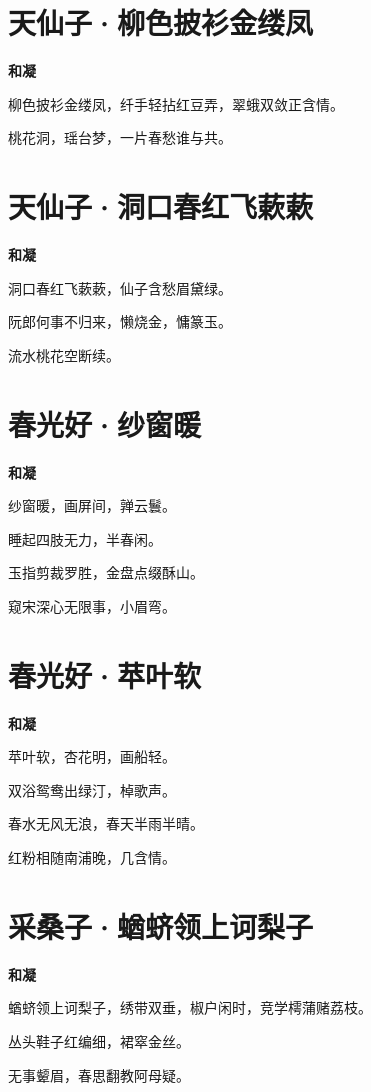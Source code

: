 \documentclass[12pt,a4paper]{ctexbook}
\begin{document}
\section{天仙子·柳色披衫金缕凤}
\textbf{和凝}\par\vspace{0.5em}
柳色披衫金缕凤，纤手轻拈红豆弄，翠蛾双敛正含情。\par
桃花洞，瑶台梦，一片春愁谁与共。\par

\section{天仙子·洞口春红飞蔌蔌}
\textbf{和凝}\par\vspace{0.5em}
洞口春红飞蔌蔌，仙子含愁眉黛绿。\par
阮郎何事不归来，懒烧金，慵篆玉。\par
流水桃花空断续。\par

\section{春光好·纱窗暖}
\textbf{和凝}\par\vspace{0.5em}
纱窗暖，画屏间，亸云鬟。\par
睡起四肢无力，半春闲。\par
玉指剪裁罗胜，金盘点缀酥山。\par
窥宋深心无限事，小眉弯。\par

\section{春光好·苹叶软}
\textbf{和凝}\par\vspace{0.5em}
苹叶软，杏花明，画船轻。\par
双浴鸳鸯出绿汀，棹歌声。\par
春水无风无浪，春天半雨半晴。\par
红粉相随南浦晚，几含情。\par

\section{采桑子·蝤蛴领上诃梨子}
\textbf{和凝}\par\vspace{0.5em}
蝤蛴领上诃梨子，绣带双垂，椒户闲时，竞学樗蒲赌荔枝。\par
丛头鞋子红编细，裙窣金丝。\par
无事颦眉，春思翻教阿母疑。\par
\end{document}
